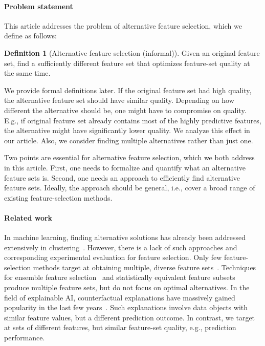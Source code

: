 \documentclass[conference]{IEEEtran}
\theoremstyle{definition}
\newtheorem{definition}{Definition}
\begin{document}
\paragraph{Problem statement}

This article addresses the problem of alternative feature selection, which we define as follows:
%
\begin{definition}[Alternative feature selection (informal)]
	Given an original feature set, find a sufficiently different feature set that optimizes feature-set quality at the same time.
	\label{def:alternative-feature-selection}
\end{definition}
%
We provide formal definitions later.
If the original feature set had high quality, the alternative feature set should have similar quality.
Depending on how different the alternative should be, one might have to compromise on quality.
E.g., if original feature set already contains most of the highly predictive features, the alternative might have significantly lower quality.
We analyze this effect in our article.
Also, we consider finding multiple alternatives rather than just one.

Two points are essential for alternative feature selection, which we both address in this article.
First, one needs to formalize and quantify what an alternative feature sets is.
Second, one needs an approach to efficiently find alternative feature sets.
Ideally, the approach should be general, i.e., cover a broad range of existing feature-selection methods.

\paragraph{Related work}

In machine learning, finding alternative solutions has already been addressed extensively in clustering~\cite{bailey2014alternative}.
However, there is a lack of such approaches and corresponding experimental evaluation for feature selection.
Only few feature-selection methods target at obtaining multiple, diverse feature sets~\cite{borboudakis2021extending, siddiqi2020genetic}.
Techniques for ensemble feature selection~\cite{saeys2008robust, seijo2017ensemble} and statistically equivalent feature subsets~\cite{lagani2017feature} produce multiple feature sets, but do not focus on optimal alternatives.
In the field of explainable AI, counterfactual explanations have massively gained popularity in the last few years~\cite{verma2020counterfactual, stepin2021survey}.
Such explanations involve data objects with similar feature values, but a different prediction outcome.
In contrast, we target at sets of different features, but similar feature-set quality, e.g., prediction performance.
\end{document}

